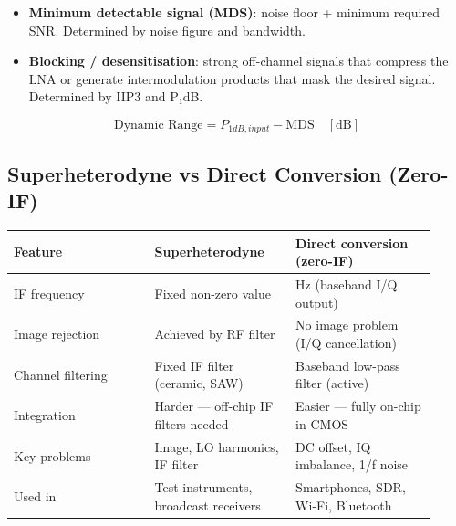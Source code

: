      
\begin{itemize}

        \item \textbf{Minimum detectable signal (MDS)}: noise floor + minimum required SNR. Determined by noise figure and bandwidth.

        \item \textbf{Blocking / desensitisation}: strong off-channel signals that compress the LNA or generate intermodulation products that mask the desired signal. Determined by IIP3 and P₁dB.

      
\end{itemize}

      
\[\text{Dynamic Range} = P_{1dB,input} - \text{MDS}\quad[\text{dB}]\]

      

\subsection{Superheterodyne vs Direct Conversion (Zero-IF)}

      
        
        
        
        
        
        
        
      

{\small\begin{longtable}{>{\raggedright\arraybackslash}p{0.307\linewidth}>{\raggedright\arraybackslash}p{0.307\linewidth}>{\raggedright\arraybackslash}p{0.307\linewidth}}
\hline
\textbf{Feature} & \textbf{Superheterodyne} & \textbf{Direct conversion (zero-IF)} \\
\hline
IF frequency & Fixed non-zero value & 0 Hz (baseband I/Q output) \\
Image rejection & Achieved by RF filter & No image problem (I/Q cancellation) \\
Channel filtering & Fixed IF filter (ceramic, SAW) & Baseband low-pass filter (active) \\
Integration & Harder — off-chip IF filters needed & Easier — fully on-chip in CMOS \\
Key problems & Image, LO harmonics, IF filter & DC offset, IQ imbalance, 1/f noise \\
Used in & Test instruments, broadcast receivers & Smartphones, SDR, Wi-Fi, Bluetooth \\
\hline
\end{longtable}}



